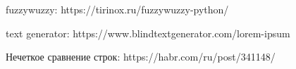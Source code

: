 \begin{thebibliography}{99}

fuzzywuzzy: https://tirinox.ru/fuzzywuzzy-python/

text generator: https://www.blindtextgenerator.com/lorem-ipsum

Нечеткое сравнение строк: https://habr.com/ru/post/341148/

\end{thebibliography}